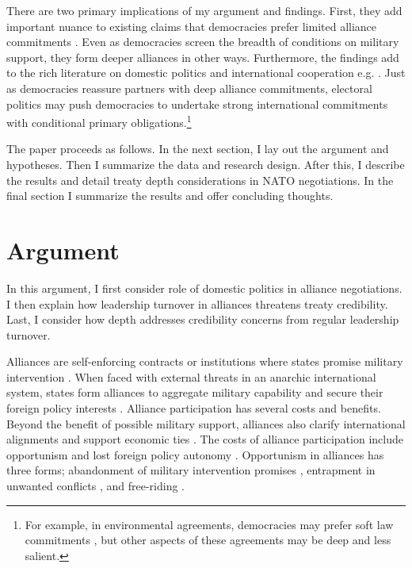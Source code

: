 \documentclass[12pt]{article}
\begin{document}
There are two primary implications of my argument and findings. 
First, they add important nuance to existing claims that democracies prefer limited alliance commitments \citep{Mattes2012, Chibaetal2015, FjelstulReiter2019}. 
Even as democracies screen the breadth of conditions on military support, they form deeper alliances in other ways.
Furthermore, the findings add to the rich literature on domestic politics and international cooperation e.g. \citep{DownesRocke1995, Fearon1998, Leeds1999, MattesRodriguez2014}. 
Just as democracies reassure partners with deep alliance commitments, electoral politics may push democracies to undertake strong international commitments with conditional primary obligations.\footnote{For example, in environmental agreements, democracies may prefer soft law commitments \citep{BoehmeltButkute2018}, but other aspects of these agreements may be deep and less salient.} 


The paper proceeds as follows. 
In the next section, I lay out the argument and hypotheses. 
Then I summarize the data and research design. 
After this, I describe the results and detail treaty depth considerations in NATO negotiations.
In the final section I summarize the results and offer concluding thoughts. 


\section{Argument}


In this argument, I first consider role of domestic politics in alliance negotiations. 
I then explain how leadership turnover in alliances threatens treaty credibility. 
Last, I consider how depth addresses credibility concerns from regular leadership turnover. 


Alliances are self-enforcing contracts or institutions where states promise military intervention \citep{Leedsetal2002, Morrow2000}. 
When faced with external threats in an anarchic international system, states form alliances to aggregate military capability and secure their foreign policy interests \citep{Altfield1984, Smith1995, Snyder1997, FordhamPoast2014}.
Alliance participation has several costs and benefits.
Beyond the benefit of possible military support, alliances also clarify international alignments \citep{Snyder1990} and support economic ties \citep{Gowa1995, Li2003, Long2003, Fordham2010, WolfordKim2017}.  
The costs of alliance participation include opportunism and lost foreign policy autonomy \citep{Altfield1984, Morrow2000, Johnson2015}. 
Opportunism in alliances has three forms; abandonment of military intervention promises \citep{Leeds2003a, BerkemeierFuhrmann2018}, entrapment in unwanted conflicts \citep{Snyder1984}, and free-riding \citep{Morrow2000}.
\end{document}
